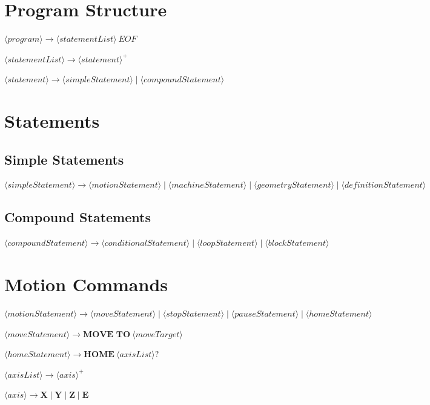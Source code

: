\section{Program Structure}

\(
\langle program \rangle \rightarrow \langle statementList \rangle\ EOF
\)

\(
\langle statementList \rangle \rightarrow \langle statement \rangle^+
\)

\(
\langle statement \rangle \rightarrow \langle simpleStatement \rangle \mid \langle compoundStatement \rangle
\)

\section{Statements}

\subsection{Simple Statements}

\(
\langle simpleStatement \rangle \rightarrow
\langle motionStatement \rangle
\mid \langle machineStatement \rangle
\mid \langle geometryStatement \rangle
\mid \langle definitionStatement \rangle
\)

\subsection{Compound Statements}

\(
\langle compoundStatement \rangle \rightarrow
\langle conditionalStatement \rangle
\mid \langle loopStatement \rangle
\mid \langle blockStatement \rangle
\)

\section{Motion Commands}

\(
\langle motionStatement \rangle \rightarrow
\langle moveStatement \rangle
\mid \langle stopStatement \rangle
\mid \langle pauseStatement \rangle
\mid \langle homeStatement \rangle
\)

\(
\langle moveStatement \rangle \rightarrow \textbf{MOVE TO} \ \langle moveTarget \rangle
\)

\(
\langle homeStatement \rangle \rightarrow \textbf{HOME} \ \langle axisList \rangle?
\)

\(
\langle axisList \rangle \rightarrow \langle axis \rangle^+
\)

\(
\langle axis \rangle \rightarrow \textbf{X} \mid \textbf{Y} \mid \textbf{Z} \mid \textbf{E}
\)

